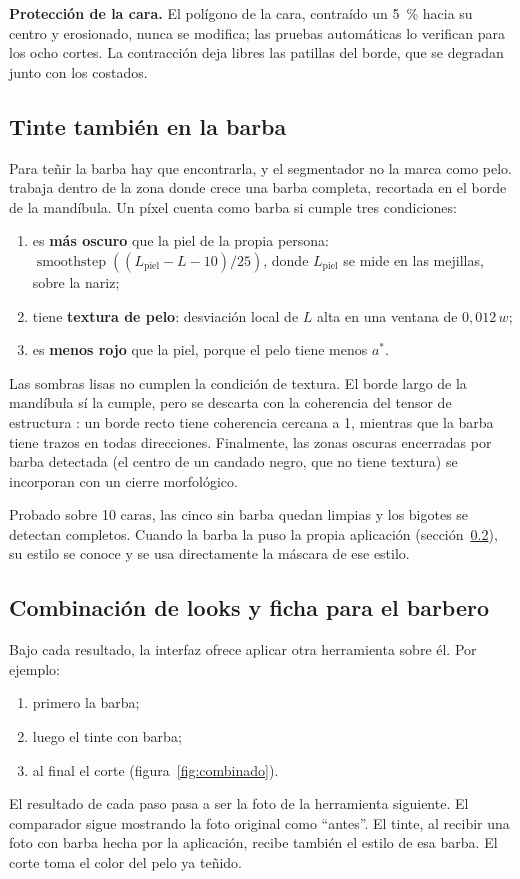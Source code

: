 \textbf{Protección de la cara.} El polígono de la cara, contraído un 5~\% hacia su centro y erosionado, nunca se modifica; las pruebas automáticas lo verifican para los ocho cortes. La contracción deja libres las patillas del borde, que se degradan junto con los costados.

\subsection{Tinte también en la barba}
\label{sec:barbatinte}

Para teñir la barba hay que encontrarla, y el segmentador no la marca como pelo.  trabaja dentro de la zona donde crece una barba completa, recortada en el borde de la mandíbula. Un píxel cuenta como barba si cumple tres condiciones:
\begin{enumerate}
  \item es \textbf{más oscuro} que la piel de la propia persona: $\operatorname{smoothstep}((L_{\text{piel}}-L-10)/25)$, donde $L_{\text{piel}}$ se mide en las mejillas, sobre la nariz;
  \item tiene \textbf{textura de pelo}: desviación local de $L$ alta en una ventana de $0{,}012\,w$;
  \item es \textbf{menos rojo} que la piel, porque el pelo tiene menos $a^*$.
\end{enumerate}
Las sombras lisas no cumplen la condición de textura. El borde largo de la mandíbula sí la cumple, pero se descarta con la coherencia del tensor de estructura \cite{bigun1987}: un borde recto tiene coherencia cercana a 1, mientras que la barba tiene trazos en todas direcciones. Finalmente, las zonas oscuras encerradas por barba detectada (el centro de un candado negro, que no tiene textura) se incorporan con un cierre morfológico.

Probado sobre 10 caras, las cinco sin barba quedan limpias y los bigotes se detectan completos. Cuando la barba la puso la propia aplicación (sección~\ref{sec:combinar}), su estilo se conoce y se usa directamente la máscara de ese estilo.

\subsection{Combinación de looks y ficha para el barbero}
\label{sec:combinar}

Bajo cada resultado, la interfaz ofrece aplicar otra herramienta sobre él. Por ejemplo:
\begin{enumerate}
  \item primero la barba;
  \item luego el tinte con barba;
  \item al final el corte (figura~\ref{fig:combinado}).
\end{enumerate}
El resultado de cada paso pasa a ser la foto de la herramienta siguiente. El comparador sigue mostrando la foto original como ``antes''. El tinte, al recibir una foto con barba hecha por la aplicación, recibe también el estilo de esa barba. El corte toma el color del pelo ya teñido.

